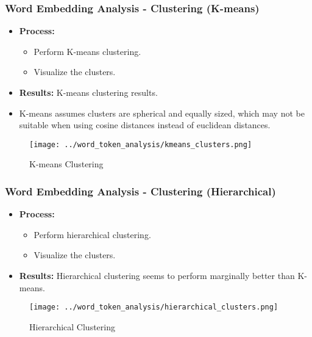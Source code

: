 \documentclass{beamer}
\begin{document}
\begin{frame}
\frametitle{Word Embedding Analysis - Clustering (K-means)}
\begin{itemize}
    \item \textbf{Process:}
    \begin{itemize}
        \item Perform K-means clustering.
        \item Visualize the clusters.
    \end{itemize}
    \item \textbf{Results:} K-means clustering results.
    \item K-means assumes clusters are spherical and equally sized, which may not be suitable when using cosine distances instead of euclidean distances.
\end{itemize}
\begin{figure}[h]
    \centering
    \texttt{[image: ../word\_token\_analysis/kmeans\_clusters.png]}
    \caption{K-means Clustering}
\end{figure}
\end{frame}

\begin{frame}
\frametitle{Word Embedding Analysis - Clustering (Hierarchical)}
\begin{itemize}
    \item \textbf{Process:}
    \begin{itemize}
        \item Perform hierarchical clustering.
        \item Visualize the clusters.
    \end{itemize}
    \item \textbf{Results:} Hierarchical clustering seems to perform marginally better than K-means.
\end{itemize}
\begin{figure}[h]
    \centering
    \texttt{[image: ../word\_token\_analysis/hierarchical\_clusters.png]}
    \caption{Hierarchical Clustering}
\end{figure}
\end{frame}
\end{document}

